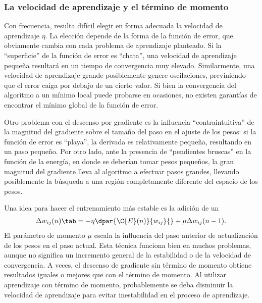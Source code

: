 %
\subsubsection{La velocidad de aprendizaje y el término de momento}
%
Con frecuencia, resulta difícil elegir en forma adecuada la velocidad
de aprendizaje $\eta$. La elección depende de la forma de la función
de error, que obviamente cambia con cada problema de aprendizaje
planteado. Si la ``superficie'' de la función de error es ``chata'',
una velocidad de aprendizaje pequeña resultará en un tiempo de
convergencia muy elevado.  Similarmente, una velocidad de aprendizaje
grande posiblemente genere oscilaciones, previniendo que el error
caiga por debajo de un cierto valor. Si bien la convergencia del
algoritmo a un mínimo local puede probarse en ocasiones, no existen
garantías de encontrar el mínimo global de la función de error.

Otro problema con el descenso por gradiente es la influencia
``contraintuitiva'' de la magnitud del gradiente sobre el tamaño del
paso en el ajuste de los pesos: si la función de error es ``playa'',
la derivada es relativamente pequeña, resultando en un paso pequeño.
Por otro lado, ante la presencia de ``pendientes bruscas'' en la
función de la energía, en donde se deberían tomar pesos pequeños, la
gran magnitud del gradiente lleva al algoritmo a efectuar pasos
grandes, llevando posiblemente la búsqueda a una región completamente
diferente del espacio de los pesos.

Una idea para hacer el entrenamiento más estable es la adición de un
%
\begin{align}\label{e2:momentum-term} %
  \Delta w_{ij}(n)\tab=-\eta\dpar{\C{E}(n)}{w_{ij}}{}
  +\mu\Delta w_{ij}(n-1).
\end{align}
%
El parámetro de momento $\mu$ escala la influencia del paso anterior
de actualización de los pesos en el paso actual. Esta técnica funciona
bien en muchos problemas, aunque no significa un incremento general de
la estabilidad o de la velocidad de convergencia. A veces, el descenso
de gradiente sin término de momento obtiene resultados iguales o
mejores que con el término de momento.  Al utilizar aprendizaje con
término de momento, probablemente se deba disminuir la velocidad de
aprendizaje para evitar inestabilidad en el proceso de aprendizaje.

